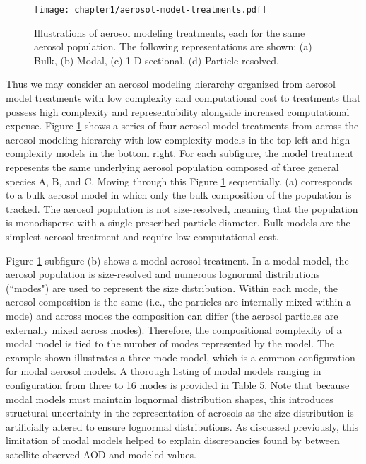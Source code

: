 \begin{figure}[!t]
	\centering
	\texttt{[image: chapter1/aerosol-model-treatments.pdf]}
	\caption{Illustrations of aerosol modeling treatments, each for the same aerosol population. The following representations are shown: (a) Bulk, (b) Modal, (c) 1-D sectional, (d) Particle-resolved.}
	\label{fig:aerosol-models}
\end{figure}

Thus we may consider an aerosol modeling hierarchy organized from aerosol model treatments with low complexity and computational cost to treatments that possess high complexity and representability alongside increased computational expense. Figure \ref{fig:aerosol-models} shows a series of four aerosol model treatments from across the aerosol modeling hierarchy with low complexity models in the top left and high complexity models in the bottom right. For each subfigure, the model treatment represents the same underlying aerosol population composed of three general species A, B, and C. Moving through this Figure \ref{fig:aerosol-models} sequentially, (a) corresponds to a bulk aerosol model in which only the bulk composition of the population is tracked. The aerosol population is not size-resolved, meaning that the population is monodisperse with a single prescribed particle diameter. Bulk models are the simplest aerosol treatment and require low computational cost. 

Figure \ref{fig:aerosol-models} subfigure (b) shows a modal aerosol treatment. In a modal model, the aerosol population is size-resolved and numerous lognormal distributions (``modes") are used to represent the size distribution. Within each mode, the aerosol composition is the same (i.e., the particles are internally mixed within a mode) and across modes the composition can differ (the aerosol particles are externally mixed across modes). Therefore, the compositional complexity of a modal model is tied to the number of modes represented by the model. The example shown illustrates a three-mode model, which is a common configuration for modal aerosol models. A thorough listing of modal models ranging in configuration from three to 16 modes is provided in \cite{riemer_aerosol_2019} Table 5. Note that because modal models must maintain lognormal distribution shapes, this introduces structural uncertainty in the representation of aerosols as the size distribution is artificially altered to ensure lognormal distributions. As discussed previously, this limitation of modal models helped to explain discrepancies found by \cite{crippa_impact_2017} between satellite observed AOD and modeled values.  

